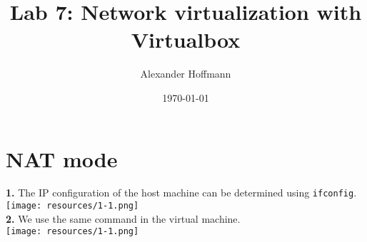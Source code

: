 \documentclass[12pt]{extarticle}
\title{Lab 7: Network virtualization with Virtualbox}
\author{Alexander Hoffmann}
\date{\today}
\begin{document}
\maketitle

\section{NAT mode}
\textbf{1.} The IP configuration of the host machine can be determined using \texttt{ifconfig}.\\
\texttt{[image: resources/1-1.png]}\\

\textbf{2.} We use the same command in the virtual machine.\\
\texttt{[image: resources/1-1.png]}\\
\end{document}
